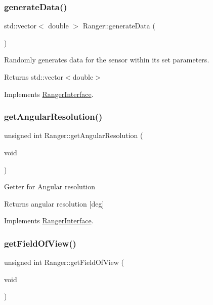 \subsubsection{\texorpdfstring{generate\+Data()}{generateData()}}
{\footnotesize\ttfamily std\+::vector$<$ double $>$ Ranger\+::generate\+Data (\begin{DoxyParamCaption}{ }\end{DoxyParamCaption})\hspace{0.3cm}{\ttfamily [virtual]}}



Randomly generates data for the sensor within its set parameters. 

\begin{DoxyReturn}{Returns}
std\+::vector$<$double$>$ 
\end{DoxyReturn}


Implements \hyperlink{classRangerInterface_a969c670cadf55a15733809116dc305c8}{Ranger\+Interface}.

\mbox{\label{classRanger_a95b5013ae191d1e19b93fab002306718}} 
\subsubsection{\texorpdfstring{get\+Angular\+Resolution()}{getAngularResolution()}}
{\footnotesize\ttfamily unsigned int Ranger\+::get\+Angular\+Resolution (\begin{DoxyParamCaption}\item[{void}]{ }\end{DoxyParamCaption})\hspace{0.3cm}{\ttfamily [virtual]}}

Getter for Angular resolution \begin{DoxyReturn}{Returns}
angular resolution \mbox{[}deg\mbox{]} 
\end{DoxyReturn}


Implements \hyperlink{classRangerInterface_a37d4f89daffa8b2708dfc11034893552}{Ranger\+Interface}.

\mbox{\label{classRanger_a4bca7dce56b7959257d90b1f30bf0271}} 
\subsubsection{\texorpdfstring{get\+Field\+Of\+View()}{getFieldOfView()}}
{\footnotesize\ttfamily unsigned int Ranger\+::get\+Field\+Of\+View (\begin{DoxyParamCaption}\item[{void}]{ }\end{DoxyParamCaption})\hspace{0.3cm}{\ttfamily [virtual]}}

